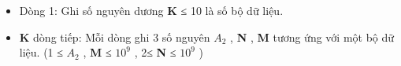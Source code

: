\begin{itemize}
	\item Dòng 1: Ghi số nguyên dương \textbf{ K } ≤ 10 là số bộ dữ liệu.
	\item \textbf{K } dòng tiếp: Mỗi dòng ghi 3 số nguyên $A_{2}$ , \textbf{ N } , \textbf{ M } tương ứng với một bộ dữ liệu. (1 ≤ $A_{2}$ , \textbf{ M } ≤ $10^{9}$ , 2≤ \textbf{ N } ≤ $10^{9}$ )
\end{itemize}